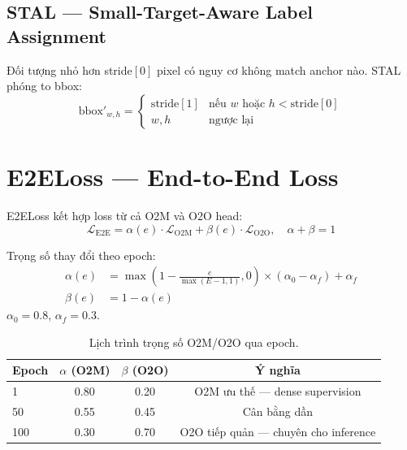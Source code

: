 \subsection{STAL --- Small-Target-Aware Label Assignment}

Đối tượng nhỏ hơn stride$[0]$ pixel có nguy cơ không match anchor nào. STAL phóng to bbox:
\begin{equation}
    \text{bbox}'_{w,h} = \begin{cases}
    \text{stride}[1] & \text{nếu } w \text{ hoặc } h < \text{stride}[0] \\
    w, h & \text{ngược lại}
    \end{cases}
\end{equation}

\section{E2ELoss --- End-to-End Loss}
\label{sec:e2e_loss}

E2ELoss kết hợp loss từ cả O2M và O2O head:
\begin{equation}
    \mathcal{L}_{\text{E2E}} = \alpha(e) \cdot \mathcal{L}_{\text{O2M}} + \beta(e) \cdot \mathcal{L}_{\text{O2O}}, \quad \alpha + \beta = 1
    \label{eq:e2e_loss}
\end{equation}

Trọng số thay đổi theo epoch:
\begin{align}
    \alpha(e) &= \max\left(1 - \frac{e}{\max(E-1, 1)}, 0\right) \times (\alpha_0 - \alpha_f) + \alpha_f \\
    \beta(e) &= 1 - \alpha(e)
\end{align}
$\alpha_0 = 0.8$, $\alpha_f = 0.3$.

\begin{table}[H]
\centering
\begin{tabular}{lccc}
\toprule
\textbf{Epoch} & \textbf{$\alpha$ (O2M)} & \textbf{$\beta$ (O2O)} & \textbf{Ý nghĩa} \\
\midrule
1   & 0.80 & 0.20 & O2M ưu thế --- dense supervision \\
50  & 0.55 & 0.45 & Cân bằng dần \\
100 & 0.30 & 0.70 & O2O tiếp quản --- chuyên cho inference \\
\bottomrule
\end{tabular}
\caption{Lịch trình trọng số O2M/O2O qua epoch.}
\label{tab:o2m_o2o_schedule}
\end{table}

